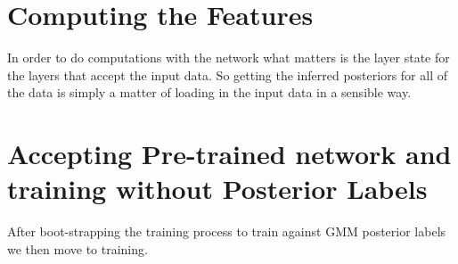 \documentclass{article} %
\begin{document}
\section{Computing the Features}

In order to do computations with the network what matters is the layer state for the layers that accept the input data.
So getting the inferred posteriors for all of the data is simply a matter of loading in the input data in a sensible way.

\section{Accepting Pre-trained network and training without Posterior Labels}

After boot-strapping the training process to train against GMM posterior labels we then move to training.




\end{document}
